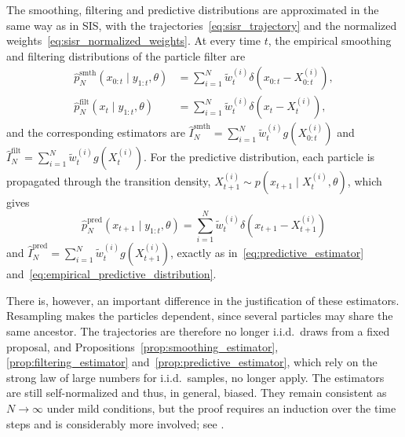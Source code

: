 The smoothing, filtering and predictive distributions are approximated in the same way as in SIS, with the trajectories~\eqref{eq:sisr_trajectory} and the normalized weights~\eqref{eq:sisr_normalized_weights}. At every time $t$, the empirical smoothing and filtering distributions of the particle filter are
\begin{align}
    \hat{p}_N^{\mathrm{smth}}(x_{0:t}\mid y_{1:t},\theta) &= \sum_{i=1}^{N} \tilde{w}_t^{(i)} \delta(x_{0:t}-X_{0:t}^{(i)}), \label{eq:pf_empirical_smoothing_distribution}\\
    \hat{p}_N^{\mathrm{filt}}(x_t\mid y_{1:t},\theta) &= \sum_{i=1}^{N} \tilde{w}_t^{(i)} \delta(x_t-X_t^{(i)}), \label{eq:pf_empirical_filtering_distribution}
\end{align}
and the corresponding estimators are $\hat{I}_N^{\mathrm{smth}} = \sum_{i=1}^{N}\tilde{w}_t^{(i)}g(X_{0:t}^{(i)})$ and $\hat{I}_N^{\mathrm{filt}} = \sum_{i=1}^{N}\tilde{w}_t^{(i)}g(X_t^{(i)})$. For the predictive distribution, each particle is propagated through the transition density, $X_{t+1}^{(i)}\sim p(x_{t+1}\mid X_t^{(i)},\theta)$, which gives
\begin{equation}
    \hat{p}_N^{\mathrm{pred}}(x_{t+1}\mid y_{1:t},\theta) = \sum_{i=1}^{N} \tilde{w}_t^{(i)} \delta(x_{t+1}-X_{t+1}^{(i)})
    \label{eq:pf_empirical_predictive_distribution}
\end{equation}
and $\hat{I}_N^{\mathrm{pred}} = \sum_{i=1}^{N}\tilde{w}_t^{(i)}g(X_{t+1}^{(i)})$, exactly as in~\eqref{eq:predictive_estimator} and~\eqref{eq:empirical_predictive_distribution}.

There is, however, an important difference in the justification of these estimators. Resampling makes the particles dependent, since several particles may share the same ancestor. The trajectories are therefore no longer i.i.d.\ draws from a fixed proposal, and Propositions~\ref{prop:smoothing_estimator}, \ref{prop:filtering_estimator} and~\ref{prop:predictive_estimator}, which rely on the strong law of large numbers for i.i.d.\ samples, no longer apply. The estimators are still self-normalized and thus, in general, biased. They remain consistent as $N\to\infty$ under mild conditions, but the proof requires an induction over the time steps and is considerably more involved; see \cite[Chapter~11]{chopin2020smc}.

